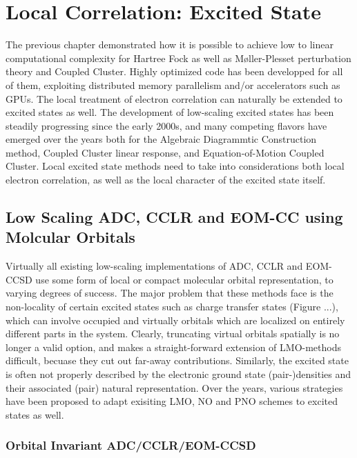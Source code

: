 \chapter{Local Correlation: Excited State}

The previous chapter demonstrated how it is possible to achieve low to linear computational complexity for Hartree Fock as well as M{\o}ller-Plesset perturbation theory and Coupled Cluster. Highly optimized code has been developped for all of them, exploiting distributed memory parallelism and/or accelerators such as GPUs. The local treatment of electron correlation can naturally be extended to excited states as well. The development of low-scaling excited states has been steadily progressing since the early 2000s, and many competing flavors have emerged over the years both for the Algebraic Diagrammtic Construction method, Coupled Cluster linear response, and Equation-of-Motion Coupled Cluster. Local excited state methods need to take into considerations both local electron correlation, as well as the local character of the excited state itself.


\section{Low Scaling ADC, CCLR and EOM-CC using Molcular Orbitals}

Virtually all existing low-scaling implementations of ADC, CCLR and EOM-CCSD use some form of local or compact molecular orbital representation, to varying degrees of success. The major problem that these methods face is the non-locality of certain excited states such as charge transfer states (Figure ...), which can involve occupied and virtually orbitals which are localized on entirely different parts in the system. Clearly, truncating virtual orbitals spatially is no longer a valid option, and makes a straight-forward extension of LMO-methods difficult, becuase they cut out far-away contributions. Similarly, the excited state is often not properly described by the electronic ground state (pair-)densities and their associated (pair) natural representation. Over the years, various strategies have been proposed to adapt exisiting LMO, NO and PNO schemes to excited states as well. 

\subsection{Orbital Invariant ADC/CCLR/EOM-CCSD}

